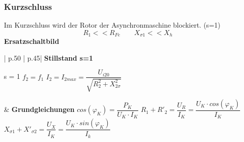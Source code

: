       \subsubsection{Kurzschluss}
          \begin{multicols}{2}
              \begin{minipage}{\linewidth}
                  Im Kurzschluss wird der Rotor der \newline Asynchronmaschine blockiert. (s=1)
                  \[ R_1 << R_{Fe} \qquad X_{\sigma 1} << X_h\]
                  \textbf{Ersatzschaltbild}\newline
              \end{minipage}
              
              \begin{minipage}{\linewidth}
              \end{minipage}
          \end{multicols}   
          
     \begin{longtable}{| p{.50\textwidth} | p{.45\textwidth}|}  
         \hline
         \textbf{Stillstand \quad s=1}\newline 
         \begin{minipage}{0.5\linewidth} 
             s = 1 \newline  
             $ f_2 = f_1 $  \newline 
             $I_2 = I_{2max} = \dfrac{U_{i20}}{\sqrt{R_2^2+X_{2\sigma}^2}}$\newline\newline
            \end{minipage}
        &
        \textbf{Grundgleichungen}\newline
         $ cos(\varphi_K)= \dfrac{P_K}{U_K \cdot I_K} $\newline
        $ R_1 + R'_2 = \dfrac{U_R}{I_K} = \dfrac{U_K \cdot cos(\varphi_K)}{I_K} $\newline
        $ X_{\sigma 1}+ X'_{\sigma 2}= \dfrac{U_X}{I_K}=\dfrac{U_K \cdot sin(\varphi_K)}{I_k} $
        \\ \hline
    \end{longtable}
    \clearpage
